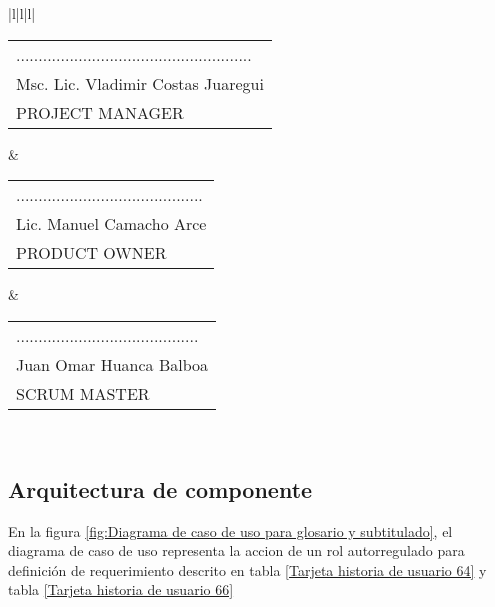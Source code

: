 \begin{minipage}[!htb]{\hsize}
\begin{tabular}{|l|l|l|}
 \\ \hline\begin{tabular}[c]{@{}l@{}}.....................................................\\ Msc. Lic. Vladimir Costas Juaregui\\ PROJECT MANAGER\end{tabular} & \begin{tabular}[c]{@{}l@{}}..........................................\\ Lic. Manuel Camacho Arce\\ PRODUCT OWNER\end{tabular} & \begin{tabular}[c]{@{}l@{}}.........................................\\ Juan Omar Huanca Balboa\\ SCRUM MASTER\end{tabular} \\ \hline
\end{tabular}
\label{Tarjeta historia de usuario 66}
\end{minipage}

\subsection{Arquitectura de componente}

En la figura \ref{fig:Diagrama de caso de uso para glosario y subtitulado},
el diagrama de caso de uso representa la accion de un rol autorregulado
para definición de requerimiento descrito en tabla
\ref{Tarjeta historia de usuario 64} y tabla
\ref{Tarjeta historia de usuario 66}

\begin{minipage}{1.0\textwidth}
	\centering
	\label{fig:Diagrama de caso de uso para glosario y subtitulado}
\end{minipage}

